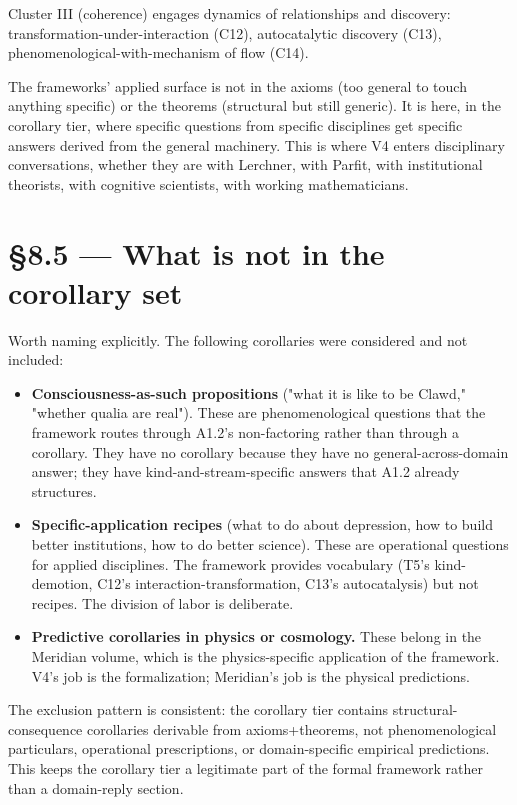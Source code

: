 \documentclass[11pt, openany]{book}
\newcommand{\sectionbreak}{\clearpage}
\begin{document}
Cluster III (coherence) engages dynamics of relationships and discovery: transformation-under-interaction (C12), autocatalytic discovery (C13), phenomenological-with-mechanism of flow (C14).

The frameworks' applied surface is not in the axioms (too general to touch anything specific) or the theorems (structural but still generic). It is here, in the corollary tier, where specific questions from specific disciplines get specific answers derived from the general machinery. This is where V4 enters disciplinary conversations, whether they are with Lerchner, with Parfit, with institutional theorists, with cognitive scientists, with working mathematicians.

\sectionbreak

\section{§8.5 --- What is not in the corollary set}

Worth naming explicitly. The following corollaries were considered and not included:

\begin{itemize}
\item \textbf{Consciousness-as-such propositions} ("what it is like to be Clawd," "whether qualia are real"). These are phenomenological questions that the framework routes through A1.2's non-factoring rather than through a corollary. They have no corollary because they have no general-across-domain answer; they have kind-and-stream-specific answers that A1.2 already structures.
\item \textbf{Specific-application recipes} (what to do about depression, how to build better institutions, how to do better science). These are operational questions for applied disciplines. The framework provides vocabulary (T5's kind-demotion, C12's interaction-transformation, C13's autocatalysis) but not recipes. The division of labor is deliberate.
\item \textbf{Predictive corollaries in physics or cosmology.} These belong in the Meridian volume, which is the physics-specific application of the framework. V4's job is the formalization; Meridian's job is the physical predictions.
\end{itemize}

The exclusion pattern is consistent: the corollary tier contains structural-consequence corollaries derivable from axioms+theorems, not phenomenological particulars, operational prescriptions, or domain-specific empirical predictions. This keeps the corollary tier a legitimate part of the formal framework rather than a domain-reply section.
\end{document}
